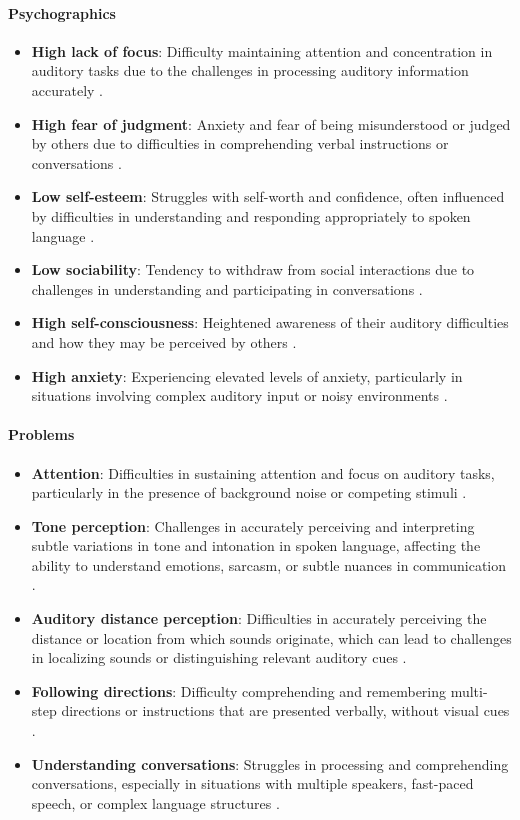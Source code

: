 \paragraph{Psychographics}
\begin{itemize}
    \item \textbf{High lack of focus}: Difficulty maintaining attention and concentration in auditory tasks due to the challenges in processing auditory information accurately \cite{Nationwide}.
    \item \textbf{High fear of judgment}: Anxiety and fear of being misunderstood or judged by others due to difficulties in comprehending verbal instructions or conversations \cite{KidsHealth}.
    \item \textbf{Low self-esteem}: Struggles with self-worth and confidence, often influenced by difficulties in understanding and responding appropriately to spoken language \cite{WebMD}.
    \item \textbf{Low sociability}: Tendency to withdraw from social interactions due to challenges in understanding and participating in conversations \cite{HearingHealth}.
    \item \textbf{High self-consciousness}: Heightened awareness of their auditory difficulties and how they may be perceived by others \cite{WebMD}.
    \item \textbf{High anxiety}: Experiencing elevated levels of anxiety, particularly in situations involving complex auditory input or noisy environments \cite{Nationwide}.
\end{itemize}

\paragraph{Problems}
\begin{itemize}
    \item \textbf{Attention}: Difficulties in sustaining attention and focus on auditory tasks, particularly in the presence of background noise or competing stimuli \cite{WebMD}.
    \item \textbf{Tone perception}: Challenges in accurately perceiving and interpreting subtle variations in tone and intonation in spoken language, affecting the ability to understand emotions, sarcasm, or subtle nuances in communication \cite{HearingHealth}.
    \item \textbf{Auditory distance perception}: Difficulties in accurately perceiving the distance or location from which sounds originate, which can lead to challenges in localizing sounds or distinguishing relevant auditory cues \cite{Nationwide}.
    \item \textbf{Following directions}: Difficulty comprehending and remembering multi-step directions or instructions that are presented verbally, without visual cues \cite{KidsHealth}.
    \item \textbf{Understanding conversations}: Struggles in processing and comprehending conversations, especially in situations with multiple speakers, fast-paced speech, or complex language structures \cite{Nationwide}.
\end{itemize}

